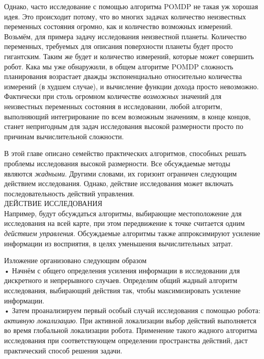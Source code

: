 \documentclass[10pt,a4paper]{article}
\begin{document}
Однако, часто исследование с помощью алгоритма POMDP не такая уж хорошая идея. Это происходит потому, что во многих задачах количество неизвестных переменных состояния огромно, как и количество возможных измерений. Возьмём, для примера задачу исследования неизвестной планеты. Количество переменных, требуемых для описания поверхности планеты будет просто гигантским. Таким же будет и количество измерений, которые может совершить робот. Кака мы уже обнаружили, в общем алгоритме POMDP сложность планирования возрастает дважды экспоненциально относительно количества измерений (в худшем случае), и вычисление функции дохода просто невозможно. Фактически при столь огромном количестве \textit{возможных} значений для неизвестных переменных состояния в исследовании, любой алгоритм, выполняющий интегрирование по всем возможным значениям, в конце концов, станет непригодным для задач исследования высокой размерности просто по причинам вычислительной сложности.

В этой главе описано семейство практических алгоритмов, способных решать проблемы исследования высокой размерности. Все обсуждаемые методы являются \textit{жадными}. Другими словами, их горизонт ограничен следующим действием исследования. Однако, действие исследования может включать последовательность действий управления.\\

ДЕЙСТВИЕ ИССЛЕДОВАНИЯ\\
Например, будут обсуждаться алгоритмы, выбирающие местоположение для исследования на всей карте, при этом передвижение к точке считается одним \textit{действием управления}. Обсуждаемые алгоритмы также аппроксимируют усиление информации из восприятия, в целях уменьшения вычислительных затрат.

Изложение организовано следующим образом\\

•	Начнём с общего определения усиления информации в исследовании для дискретного и непрерывного случаев. Определим общий жадный алгоритм исследования, выбирающий действия так, чтобы максимизировать усиление информации.\\

•	Затем проанализируем первый особый случай исследования с помощью робота: \textit{активную локализацию}. При активной локализации выбор действий выполняется во время глобальной локализации робота. Применение такого жадного алгоритма исследования при соответствующем определении пространства действий,  даст практический способ решения задачи.\\ 
\end{document}
